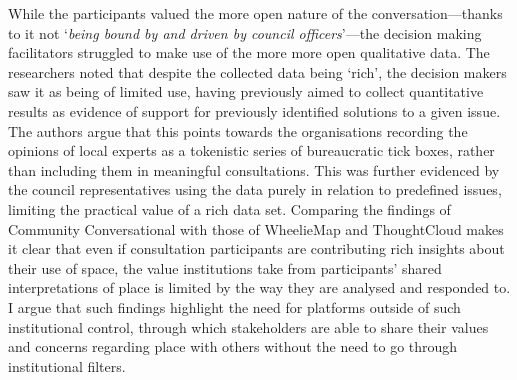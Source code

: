 While the participants valued the more open nature of the conversation---thanks to it not `\textit{being bound by and driven by council officers}'---the decision making facilitators struggled to make use of the more more open qualitative data. The researchers noted that despite the collected data being `rich', the decision makers saw it as being of limited use, having previously aimed to collect quantitative results as evidence of support for previously identified solutions to a given issue. The authors argue that this points towards the organisations recording the opinions of local experts as a tokenistic series of bureaucratic tick boxes, rather than including them in meaningful consultations. This was further evidenced by the council representatives using the data purely in relation to predefined issues, limiting the practical value of a rich data set. Comparing the findings of Community Conversational with those of WheelieMap and ThoughtCloud makes it clear that even if consultation participants are contributing rich insights about their use of space, the value institutions take from participants' shared interpretations of place is limited by the way they are analysed and responded to. I argue that such findings highlight the need for platforms outside of such institutional control, through which stakeholders are able to share their values and concerns regarding place with others without the need to go through institutional filters.

